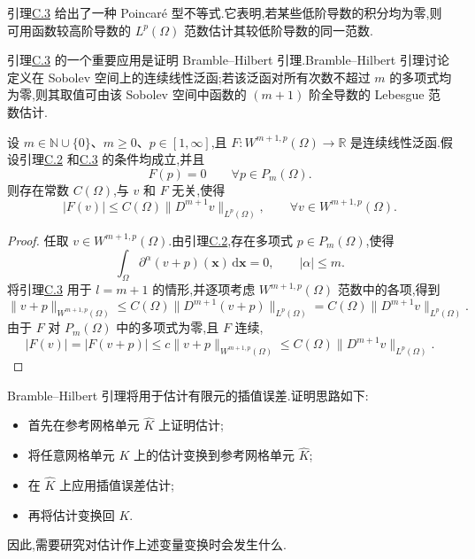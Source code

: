 \begin{note}[关于引理 C.3]\label{note:appendix-c-4}
引理\hyperref[lem:appendix-c-3]{C.3} 给出了一种 Poincaré 型不等式.它表明,若某些低阶导数的积分均为零,则可用函数较高阶导数的 $L^p(\Omega)$ 范数估计其较低阶导数的同一范数.

引理\hyperref[lem:appendix-c-3]{C.3} 的一个重要应用是证明 Bramble--Hilbert 引理.Bramble--Hilbert 引理讨论定义在 Sobolev 空间上的连续线性泛函;若该泛函对所有次数不超过 $m$ 的多项式均为零,则其取值可由该 Sobolev 空间中函数的 $(m+1)$ 阶全导数的 Lebesgue 范数估计.
\end{note}

\begin{theorem}\label{lem:appendix-c-5}
设 $m\in\mathbb N\cup\{0\}$、$m\ge0$、$p\in[1,\infty]$,且
$F:W^{m+1,p}(\Omega)\to\mathbb R$ 是连续线性泛函.假设引理\hyperref[lem:appendix-c-2]{C.2} 和\hyperref[lem:appendix-c-3]{C.3} 的条件均成立,并且
\[
 F(p)=0\qquad\forall p\in P_m(\Omega).
\]
则存在常数 $C(\Omega)$,与 $v$ 和 $F$ 无关,使得
\[
 |F(v)|\le C(\Omega)\|D^{m+1}v\|_{L^p(\Omega)},
 \qquad \forall v\in W^{m+1,p}(\Omega).
\]
\end{theorem}

\begin{proof}
任取 $v\in W^{m+1,p}(\Omega)$.由引理\hyperref[lem:appendix-c-2]{C.2},存在多项式 $p\in P_m(\Omega)$,使得
\[
 \int_\Omega\partial^\alpha(v+p)(\bm x)\,\mathrm d\bm x=0,
 \qquad |\alpha|\le m.
\]
将引理\hyperref[lem:appendix-c-3]{C.3} 用于 $l=m+1$ 的情形,并逐项考虑 $W^{m+1,p}(\Omega)$ 范数中的各项,得到
\[
 \|v+p\|_{W^{m+1,p}(\Omega)}
 \le C(\Omega)\|D^{m+1}(v+p)\|_{L^p(\Omega)}
 =C(\Omega)\|D^{m+1}v\|_{L^p(\Omega)}.
\]
由于 $F$ 对 $P_m(\Omega)$ 中的多项式为零,且 $F$ 连续,
\[
 |F(v)|=|F(v+p)|
 \le c\|v+p\|_{W^{m+1,p}(\Omega)}
 \le C(\Omega)\|D^{m+1}v\|_{L^p(\Omega)}.
\]
\end{proof}

\begin{note}[插值误差估计的策略]\label{note:appendix-c-6}
Bramble--Hilbert 引理将用于估计有限元的插值误差.证明思路如下:
\begin{itemize}
 \item 首先在参考网格单元 $\widehat K$ 上证明估计;
 \item 将任意网格单元 $K$ 上的估计变换到参考网格单元 $\widehat K$;
 \item 在 $\widehat K$ 上应用插值误差估计;
 \item 再将估计变换回 $K$.
\end{itemize}
因此,需要研究对估计作上述变量变换时会发生什么.
\end{note}

